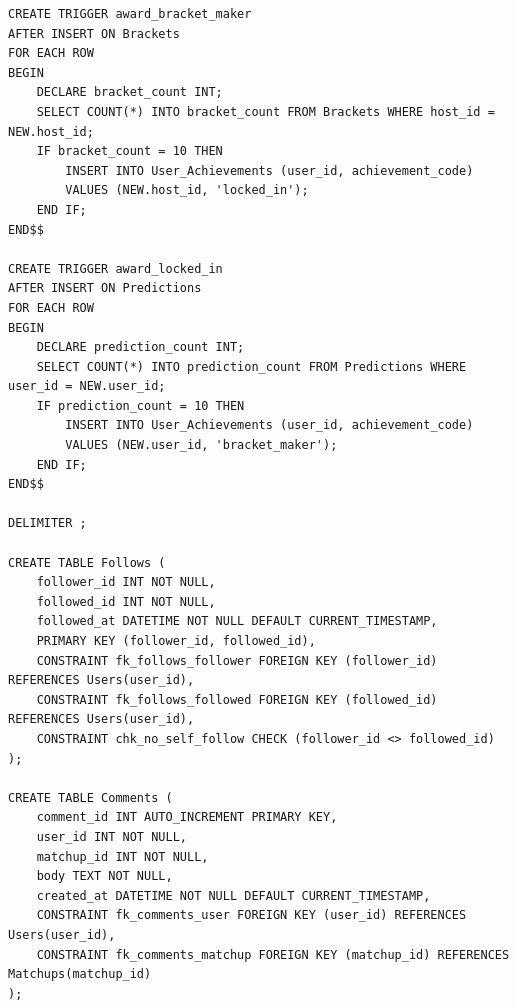 \documentclass[11pt]{article}
\begin{document}
\begin{verbatim}
CREATE TRIGGER award_bracket_maker
AFTER INSERT ON Brackets
FOR EACH ROW
BEGIN
    DECLARE bracket_count INT;
    SELECT COUNT(*) INTO bracket_count FROM Brackets WHERE host_id = NEW.host_id;
    IF bracket_count = 10 THEN
        INSERT INTO User_Achievements (user_id, achievement_code) 
        VALUES (NEW.host_id, 'locked_in');
    END IF;
END$$

CREATE TRIGGER award_locked_in
AFTER INSERT ON Predictions
FOR EACH ROW
BEGIN
    DECLARE prediction_count INT;
    SELECT COUNT(*) INTO prediction_count FROM Predictions WHERE user_id = NEW.user_id;
    IF prediction_count = 10 THEN
        INSERT INTO User_Achievements (user_id, achievement_code) 
        VALUES (NEW.user_id, 'bracket_maker');
    END IF;
END$$

DELIMITER ;

CREATE TABLE Follows (
    follower_id INT NOT NULL,
    followed_id INT NOT NULL,
    followed_at DATETIME NOT NULL DEFAULT CURRENT_TIMESTAMP,
    PRIMARY KEY (follower_id, followed_id),
    CONSTRAINT fk_follows_follower FOREIGN KEY (follower_id) REFERENCES Users(user_id),
    CONSTRAINT fk_follows_followed FOREIGN KEY (followed_id) REFERENCES Users(user_id),
    CONSTRAINT chk_no_self_follow CHECK (follower_id <> followed_id)
);

CREATE TABLE Comments (
    comment_id INT AUTO_INCREMENT PRIMARY KEY,
    user_id INT NOT NULL,
    matchup_id INT NOT NULL,
    body TEXT NOT NULL,
    created_at DATETIME NOT NULL DEFAULT CURRENT_TIMESTAMP,
    CONSTRAINT fk_comments_user FOREIGN KEY (user_id) REFERENCES Users(user_id),
    CONSTRAINT fk_comments_matchup FOREIGN KEY (matchup_id) REFERENCES Matchups(matchup_id)
);
\end{verbatim}
\end{document}
